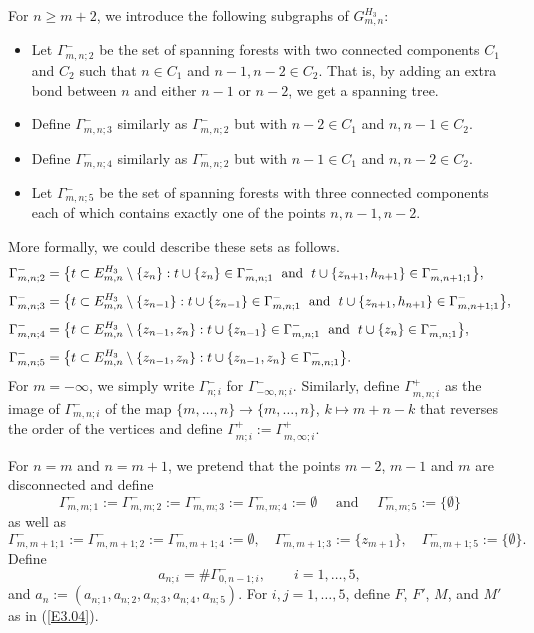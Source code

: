 \documentclass[11pt]{article}
\providecommand{\1}{\mathBB{1}}
\newcommand{\mbu}{\quad\mbox{ and }\quad}
\newcommand{\mbs}[1]{\mbox{ \;#1\; }}
\newcommand{\equ}[1]{(\ref{#1})}
\begin{document}
For $n\geq m+2$, we introduce the following subgraphs of $G^{H_3}_{m,n}$:
\begin{itemize}
\item
Let $\Gamma^-_{m,n;2}$ be the set of spanning forests with two connected components $C_1$ and $C_2$ such that $n\in C_1$ and $n-1,n-2\in C_2$. That is, by adding an extra bond between $n$ and either $n-1$ or $n-2$, we get a spanning tree.
\item
Define $\Gamma^-_{m,n;3}$ similarly as $\Gamma^-_{m,n;2}$ but with $n-2\in C_1$ and $n,n-1\in C_2$.
\item
Define $\Gamma^-_{m,n;4}$ similarly as $\Gamma^-_{m,n;2}$ but with $n-1\in C_1$ and $n,n-2\in C_2$.
\item
Let $\Gamma^-_{m,n;5}$ be the set of spanning forests with three connected components each of which contains exactly one of the points $n,n-1, n-2$.
\end{itemize}
More formally, we could describe these sets as follows.
$$\begin{aligned}
\Gamma^-_{m,n;2}&=\big\{t\subset E^{H_3}_{m,n}\setminus\{z_n\}:t\cup\{z_n\}\in\Gamma^-_{m,n;1}
  \mbs{and}t\cup\{z_{n+1},h_{n+1}\}\in\Gamma^-_{m,n+1;1}\big\},\\[1.5mm]
\Gamma^-_{m,n;3}&=\big\{t\subset E^{H_3}_{m,n}\setminus\{z_{n-1}\}:t\cup\{z_{n-1}\}\in\Gamma^-_{m,n;1}
  \mbs{and}t\cup\{z_{n+1},h_{n+1}\}\in\Gamma^-_{m,n+1;1}\big\},\\[1.5mm]
\Gamma^-_{m,n;4}&=\big\{t\subset E^{H_3}_{m,n}\setminus\{z_{n-1},z_n\}:t\cup\{z_{n-1}\}\in\Gamma^-_{m,n;1}
  \mbs{and}t\cup\{z_{n}\}\in\Gamma^-_{m,n;1}\big\},\\[1.5mm]
\Gamma^-_{m,n;5}&=\big\{t\subset E^{H_3}_{m,n}\setminus\{z_{n-1},z_n\}:t\cup\{z_{n-1},z_n\}\in\Gamma^-_{m,n;1}\big\}.
\end{aligned}
$$
For $m=-\infty$, we simply write $\Gamma^-_{n;i}$ for $\Gamma^-_{-\infty,n;i}$. Similarly, define $\Gamma^+_{m,n;i}$ as the image of $\Gamma^-_{m,n;i}$ of the map $\{m,\ldots,n\}\to\{m,\ldots,n\}$, $k\mapsto m+n-k$ that reverses the order of the vertices and define $\Gamma^+_{m;i}:=\Gamma^+_{m,\infty;i}$.

For $n=m$ and $n=m+1$, we pretend that the points $m-2$, $m-1$ and $m$ are disconnected and define
$$\Gamma^-_{m,m;1}:=\Gamma^-_{m,m;2}:=\Gamma^-_{m,m;3}:=\Gamma^-_{m,m;4}:=\emptyset\mbu
\Gamma^-_{m,m;5}:=\{\emptyset\}$$
as well as
$$\Gamma^-_{m,m+1;1}:=\Gamma^-_{m,m+1;2}:=\Gamma^-_{m,m+1;4}:=\emptyset,\quad
\Gamma^-_{m,m+1;3}:=\{z_{m+1}\},
\quad \Gamma^-_{m,m+1;5}:=\{\emptyset\}.$$
Define
$$a_{n;i}=\#\Gamma^-_{0,n-1;i},\qquad i=1,\ldots,5,$$
and $a_n:=(a_{n;1},a_{n;2},a_{n;3},a_{n;4},a_{n;5}).$
For $i,j=1,\ldots,5$, define $F$, $F'$, $M$, and $M'$ as in \equ{E3.04}.
\end{document}
